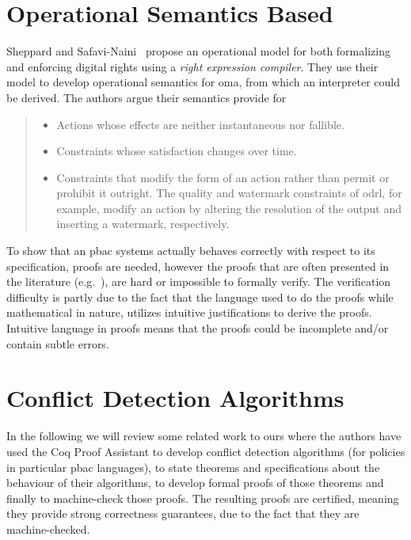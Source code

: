 \section{Operational Semantics Based}
Sheppard and Safavi-Naini~\cite{SheppardS09} propose an operational model for both formalizing and enforcing digital rights using a \emph{right expression compiler}. They use their model to develop operational semantics for \ac{oma}, from which an interpreter could be derived. The authors argue their semantics provide for 
\begin{quote}
\begin{itemize}
  \item Actions whose effects are neither instantaneous nor fallible.
  \item Constraints whose satisfaction changes over time.
  \item Constraints that modify the form of an action rather than permit or prohibit it outright. The quality and watermark constraints
of \ac{odrl}, for example, modify an action by altering the resolution of the output and inserting a watermark, respectively.
\end{itemize}
\end{quote}


To show that an \ac{pbac} systems actually behaves correctly with respect to its specification, proofs are needed, however the proofs that are often presented in the literature (e.g.~\cite{Halpern2008, pucella2006, Tschantz}), are hard or impossible to formally verify. The verification difficulty is partly due to the fact that the language used to do the proofs while mathematical in nature, utilizes intuitive justifications to derive the proofs. Intuitive language in proofs means that the proofs could be incomplete and/or contain subtle errors. 

\section{Conflict Detection Algorithms}

In the following we will review some related work to ours where the authors have used the Coq Proof Assistant to develop conflict detection algorithms (for policies in particular \ac{pbac} languages), to state theorems and specifications about the behaviour of their algorithms, to develop formal proofs of those theorems and finally to machine-check those proofs. The resulting proofs are certified, meaning they provide strong correctness guarantees, due to the fact that they are machine-checked.

